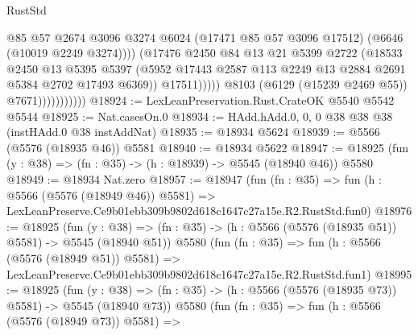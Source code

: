 \begin{lexlean}{RustStd}
\begin{coremodule}
                                      @85
                                      @57
                                      @2674
                                      @3096
                                      @3274
                                      @6024
                                      (@17471 @85 @57 @3096 @17512)
                                      (@6646 (@10019 @2249 @3274))))
                                  (@17476
                                    @2450
                                    @84
                                    @13
                                    @21
                                    @5399
                                    @2722
                                    (@18533
                                      @2450
                                      @13
                                      @5395
                                      @5397
                                      (@5952
                                        @17443
                                        @2587
                                        @113
                                        @2249
                                        @13
                                        @2884
                                        @2691
                                        @5384
                                        @2702
                                        @17493
                                        @6369))
                                    @17511)))))
                          @8103
                          (@6129 (@15239 @2469 @55))
                          @7671)))))))))))
@18924 := LexLeanPreservation.Rust.CrateOK @5540 @5542 @5544
@18925 := Nat.casesOn.{0}
@18934 := HAdd.hAdd.{0, 0, 0} @38 @38 @38 (instHAdd.{0} @38 instAddNat)
@18935 := @18934 @5624
@18939 := @5566 (@5576 (@18935 @46)) @5581
@18940 := @18934 @5622
@18947 := @18925 (fun (y : @38) => (fn : @35) -> (h : @18939) -> @5545 (@18940 @46)) @5580
@18949 := @18934 Nat.zero
@18957 := @18947
    (fun (fn : @35) =>
    fun (h : @5566 (@5576 (@18949 @46)) @5581) =>
    LexLeanPreserve.Ce9b01ebb309b9802d618c1647c27a15e.R2.RustStd.fun0)
@18976 := @18925
    (fun (y : @38) => (fn : @35) -> (h : @5566 (@5576 (@18935 @51)) @5581) -> @5545 (@18940 @51))
    @5580
    (fun (fn : @35) =>
    fun (h : @5566 (@5576 (@18949 @51)) @5581) =>
    LexLeanPreserve.Ce9b01ebb309b9802d618c1647c27a15e.R2.RustStd.fun1)
@18995 := @18925
    (fun (y : @38) => (fn : @35) -> (h : @5566 (@5576 (@18935 @73)) @5581) -> @5545 (@18940 @73))
    @5580
    (fun (fn : @35) =>
    fun (h : @5566 (@5576 (@18949 @73)) @5581) =>

\end{coremodule}
\end{lexlean}
